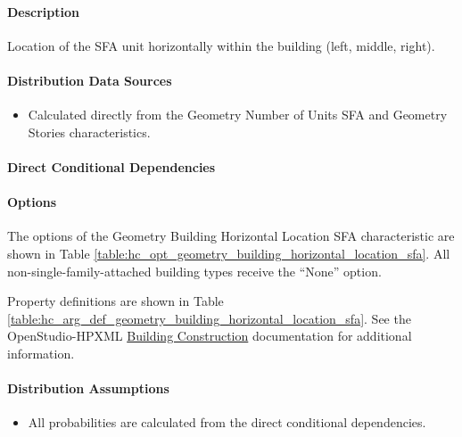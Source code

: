 \paragraph{Description}
% 
Location of the SFA unit horizontally within the building (left, middle, right).

\paragraph{Distribution Data Sources}
% 
\begin{itemize}
    \item Calculated directly from the Geometry Number of Units SFA and Geometry Stories characteristics.
\end{itemize}

\paragraph{Direct Conditional Dependencies}


\paragraph{Options}
The options of the Geometry Building Horizontal Location SFA characteristic are shown in Table \ref{table:hc_opt_geometry_building_horizontal_location_sfa}. All non-single-family-attached building types receive the ``None'' option.



Property definitions are shown in Table \ref{table:hc_arg_def_geometry_building_horizontal_location_sfa}. See the OpenStudio-HPXML \href{https://openstudio-hpxml.readthedocs.io/en/v1.10.0/workflow_inputs.html#hpxml-building-construction}{Building Construction} documentation for additional information.



\paragraph{Distribution Assumptions}
% 
\begin{itemize}
    \item All probabilities are calculated from the direct conditional dependencies.
\end{itemize}
